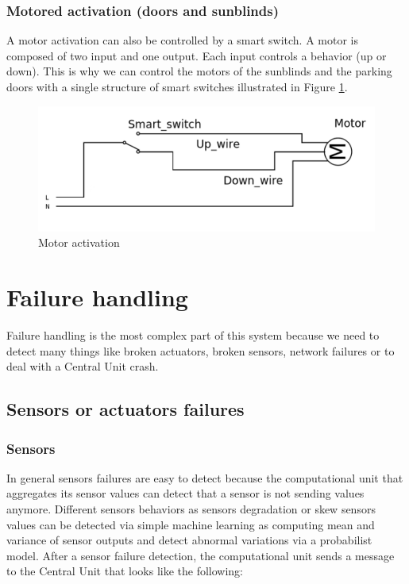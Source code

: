 \documentclass{acm_proc_article-sp}
\begin{document}
\subsubsection{Motored activation (doors and sunblinds)}
A motor activation can also be controlled by a smart switch.
A motor is composed of two input and one output. Each input controls a behavior (up or down).
This is why we can control the motors of the sunblinds and the parking doors with a single structure of smart switches illustrated in Figure \ref{motor}.
				\begin{figure}[htb]
  				\begin{center}
    				\includegraphics[width=\linewidth]{motor}
    				\caption{Motor activation \label{motor}}
  				\end{center}
				\end{figure}

\section{Failure handling}\label{failure_handling}
Failure handling is the most complex part of this system because we need to detect many things like broken actuators, broken sensors, 
network failures or to deal with a Central Unit crash.
\subsection{Sensors or actuators failures}
\subsubsection{Sensors}
In general sensors failures are easy to detect because the computational unit that aggregates its sensor values can detect that a sensor is not sending values anymore. 
Different sensors behaviors as sensors degradation or skew sensors values can be detected via simple machine learning as computing mean and variance of sensor outputs and detect abnormal variations via a probabilist model.
After a sensor failure detection, the computational unit sends a message to the Central Unit that looks like the following: 
\end{document}
